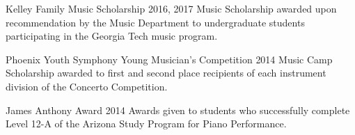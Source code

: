 \begin{minipage}[t]{0.2\textwidth}
	\flushleft
\end{minipage}
\begin{minipage}[t]{0.75\textwidth}
	\award
	{Kelley Family Music Scholarship}
	{2016, 2017}
	{Music Scholarship awarded upon recommendation by the Music Department to undergraduate students participating in the Georgia Tech music program.}
	
	\award
	{Phoenix Youth Symphony Young Musician's Competition}
	{2014}
	{Music Camp Scholarship awarded to first and second place recipients of each instrument division of the Concerto Competition.}

	\award
	{James Anthony Award}
	{2014}
	{Awards given to students who successfully complete Level 12-A of the Arizona Study Program for Piano Performance.}
\end{minipage}

\vspace{8pt}